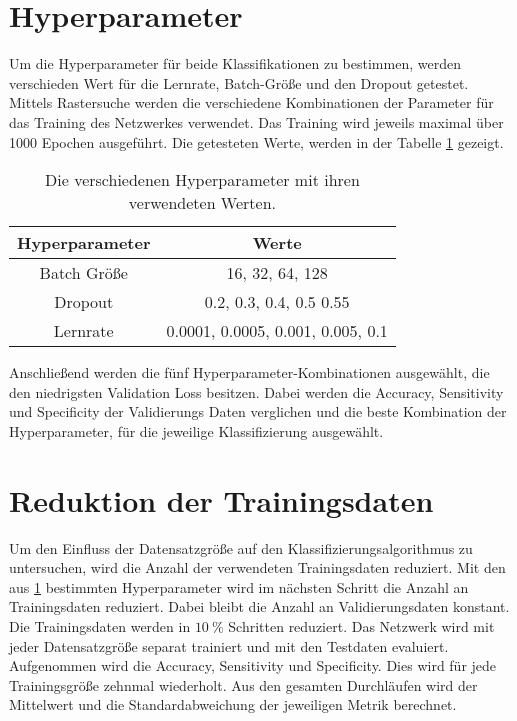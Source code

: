 \section{Hyperparameter}\label{sec:Hyperparameter}

Um die Hyperparameter für beide Klassifikationen zu bestimmen, werden verschieden Wert für die
Lernrate, Batch-Größe und den Dropout getestet.
Mittels Rastersuche werden die verschiedene Kombinationen der Parameter für das Training des Netzwerkes verwendet. 
Das Training wird jeweils maximal über 1000 Epochen ausgeführt.
Die getesteten Werte, werden in der Tabelle \ref{tab:Hypp} gezeigt.

\begin{table}[htbp]
    \centering
    \begin{tabular}{c c}
        \toprule
        Hyperparameter     & Werte \\
        \midrule
        Batch Größe    & 16, 32, 64, 128   \\
        Dropout        & 0.2, 0.3, 0.4, 0.5 0.55   \\
        Lernrate       & 0.0001, 0.0005, 0.001, 0.005, 0.1   \\
        \bottomrule
  \end{tabular}
  \caption{Die verschiedenen Hyperparameter mit ihren verwendeten Werten.}
  \label{tab:Hypp}
\end{table}
Anschließend werden die fünf Hyperparameter-Kombinationen ausgewählt, die den niedrigsten Validation Loss besitzen.
Dabei werden die Accuracy, Sensitivity und Specificity der Validierungs Daten verglichen und die beste Kombination der Hyperparameter, 
für die jeweilige Klassifizierung ausgewählt.  

\section{Reduktion der Trainingsdaten}\label{sec:Red1}
Um den Einfluss der Datensatzgröße auf den Klassifizierungsalgorithmus zu untersuchen, wird die Anzahl der verwendeten Trainingsdaten reduziert.
Mit den aus \ref{sec:Hyperparameter} bestimmten Hyperparameter wird im nächsten Schritt die Anzahl an Trainingsdaten reduziert.
Dabei bleibt die Anzahl an Validierungsdaten konstant.
Die Trainingsdaten werden in $\qty{10}{\%}$ Schritten reduziert. 
Das Netzwerk wird mit jeder Datensatzgröße separat trainiert und mit den Testdaten evaluiert. 
Aufgenommen wird die Accuracy, Sensitivity und Specificity.
Dies wird für jede Trainingsgröße zehnmal wiederholt.
Aus den gesamten Durchläufen wird der Mittelwert und die Standardabweichung der jeweiligen Metrik berechnet.


